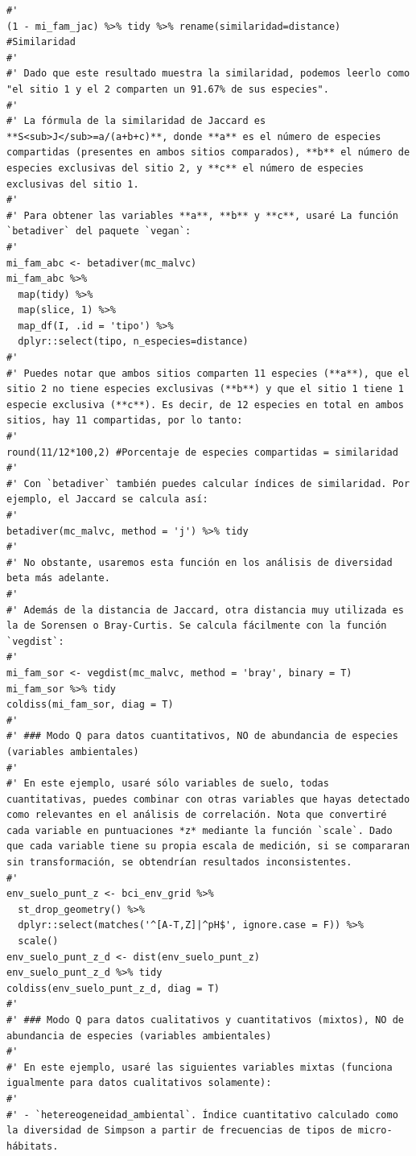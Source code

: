 \documentclass[11pt,]{article}
\begin{document}
\begin{verbatim}
#' 
(1 - mi_fam_jac) %>% tidy %>% rename(similaridad=distance) #Similaridad
#'
#' Dado que este resultado muestra la similaridad, podemos leerlo como "el sitio 1 y el 2 comparten un 91.67% de sus especies".
#' 
#' La fórmula de la similaridad de Jaccard es **S<sub>J</sub>=a/(a+b+c)**, donde **a** es el número de especies compartidas (presentes en ambos sitios comparados), **b** el número de especies exclusivas del sitio 2, y **c** el número de especies exclusivas del sitio 1.
#' 
#' Para obtener las variables **a**, **b** y **c**, usaré La función `betadiver` del paquete `vegan`:
#' 
mi_fam_abc <- betadiver(mc_malvc) 
mi_fam_abc %>%
  map(tidy) %>%
  map(slice, 1) %>%
  map_df(I, .id = 'tipo') %>% 
  dplyr::select(tipo, n_especies=distance)
#' 
#' Puedes notar que ambos sitios comparten 11 especies (**a**), que el sitio 2 no tiene especies exclusivas (**b**) y que el sitio 1 tiene 1 especie exclusiva (**c**). Es decir, de 12 especies en total en ambos sitios, hay 11 compartidas, por lo tanto:
#' 
round(11/12*100,2) #Porcentaje de especies compartidas = similaridad
#' 
#' Con `betadiver` también puedes calcular índices de similaridad. Por ejemplo, el Jaccard se calcula así:
#' 
betadiver(mc_malvc, method = 'j') %>% tidy
#' 
#' No obstante, usaremos esta función en los análisis de diversidad beta más adelante.
#' 
#' Además de la distancia de Jaccard, otra distancia muy utilizada es la de Sorensen o Bray-Curtis. Se calcula fácilmente con la función `vegdist`:
#' 
mi_fam_sor <- vegdist(mc_malvc, method = 'bray', binary = T)
mi_fam_sor %>% tidy
coldiss(mi_fam_sor, diag = T)
#' 
#' ### Modo Q para datos cuantitativos, NO de abundancia de especies (variables ambientales)
#' 
#' En este ejemplo, usaré sólo variables de suelo, todas cuantitativas, puedes combinar con otras variables que hayas detectado como relevantes en el análisis de correlación. Nota que convertiré cada variable en puntuaciones *z* mediante la función `scale`. Dado que cada variable tiene su propia escala de medición, si se compararan sin transformación, se obtendrían resultados inconsistentes.
#' 
env_suelo_punt_z <- bci_env_grid %>%
  st_drop_geometry() %>% 
  dplyr::select(matches('^[A-T,Z]|^pH$', ignore.case = F)) %>% 
  scale()
env_suelo_punt_z_d <- dist(env_suelo_punt_z)
env_suelo_punt_z_d %>% tidy
coldiss(env_suelo_punt_z_d, diag = T)
#'
#' ### Modo Q para datos cualitativos y cuantitativos (mixtos), NO de abundancia de especies (variables ambientales)
#' 
#' En este ejemplo, usaré las siguientes variables mixtas (funciona igualmente para datos cualitativos solamente):
#' 
#' - `hetereogeneidad_ambiental`. Índice cuantitativo calculado como la diversidad de Simpson a partir de frecuencias de tipos de micro-hábitats.

\end{verbatim}
\end{document}
